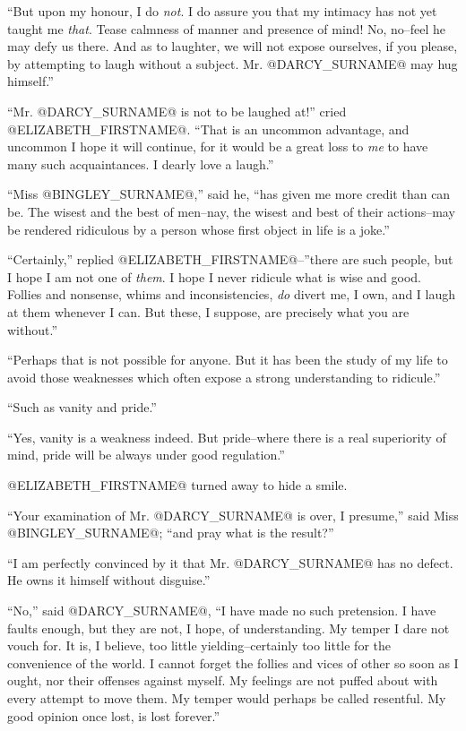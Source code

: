 ``But upon my honour, I do \textit{not}. I do assure you that my intimacy has
not yet taught me \textit{that}. Tease calmness of manner and presence of
mind! No, no--feel he may defy us there. And as to laughter, we will
not expose ourselves, if you please, by attempting to laugh without a
subject. Mr. @DARCY_SURNAME@ may hug himself.''

``Mr. @DARCY_SURNAME@ is not to be laughed at!'' cried @ELIZABETH_FIRSTNAME@. ``That is an
uncommon advantage, and uncommon I hope it will continue, for it would
be a great loss to \textit{me} to have many such acquaintances. I dearly love a
laugh.''

``Miss @BINGLEY_SURNAME@,'' said he, ``has given me more credit than can be.
The wisest and the best of men--nay, the wisest and best of their
actions--may be rendered ridiculous by a person whose first object in
life is a joke.''

``Certainly,'' replied @ELIZABETH_FIRSTNAME@--''there are such people, but I hope I
am not one of \textit{them}. I hope I never ridicule what is wise and good.
Follies and nonsense, whims and inconsistencies, \textit{do} divert me, I own,
and I laugh at them whenever I can. But these, I suppose, are precisely
what you are without.''

``Perhaps that is not possible for anyone. But it has been the study
of my life to avoid those weaknesses which often expose a strong
understanding to ridicule.''

``Such as vanity and pride.''

``Yes, vanity is a weakness indeed. But pride--where there is a real
superiority of mind, pride will be always under good regulation.''

@ELIZABETH_FIRSTNAME@ turned away to hide a smile.

``Your examination of Mr. @DARCY_SURNAME@ is over, I presume,'' said Miss @BINGLEY_SURNAME@;
``and pray what is the result?''

``I am perfectly convinced by it that Mr. @DARCY_SURNAME@ has no defect. He owns it
himself without disguise.''

``No,'' said @DARCY_SURNAME@, ``I have made no such pretension. I have faults enough,
but they are not, I hope, of understanding. My temper I dare not vouch
for. It is, I believe, too little yielding--certainly too little for the
convenience of the world. I cannot forget the follies and vices of other
so soon as I ought, nor their offenses against myself. My feelings
are not puffed about with every attempt to move them. My temper
would perhaps be called resentful. My good opinion once lost, is lost
forever.''

